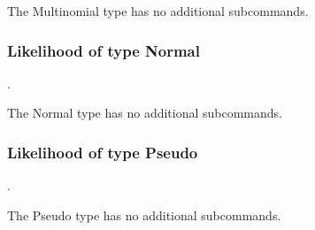 The Multinomial type has no additional subcommands.
\subsubsection{Likelihood of type Normal}
.
\label{syntax:Likelihood-Normal}

The Normal type has no additional subcommands.
\subsubsection{Likelihood of type Pseudo}
.
\label{syntax:Likelihood-Pseudo}

The Pseudo type has no additional subcommands.
